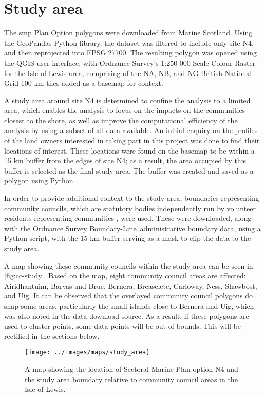 \section{Study area}

The \gls{smp} Plan Option polygons were downloaded from Marine Scotland. Using the GeoPandas Python library, the dataset was filtered to include only site N4, and then reprojected into EPSG:27700. The resulting polygon was opened using the QGIS user interface, with Ordnance Survey's 1:250 000 Scale Colour Raster for the Isle of Lewis area, comprising of the NA, NB, and NG British National Grid 100 km tiles added as a basemap for context.

A study area around site N4 is determined to confine the analysis to a limited area, which enables the analysis to focus on the impacts on the communities closest to the shore, as well as improve the computational efficiency of the analysis by using a subset of all data available. An initial enquiry on the profiles of the land owners interested in taking part in this project was done to find their locations of interest. These locations were found on the basemap to be within a 15 km buffer from the edges of site N4; as a result, the area occupied by this buffer is selected as the final study area. The buffer was created and saved as a polygon using Python.

In order to provide additional context to the study area, boundaries representing community councils, which are statutory bodies independently run by volunteer residents representing communities \autocite{cnes-cc}, were used. These were downloaded, along with the Ordnance Survey Boundary-Line\texttrademark\ administrative boundary data, using a Python script, with the 15 km buffer serving as a mask to clip the data to the study area.

A map showing these community councils within the study area can be seen in \autoref{fig:cc-study}. Based on the map, eight community council areas are affected: Airidhantuim, Barvas and Brue, Bernera, Breasclete, Carloway, Ness, Shawbost, and Uig. It can be observed that the overlayed community council polygons do snap some areas, particularly the small islands close to Bernera and Uig, which was also noted in the data download source. As a result, if these polygons are used to cluster points, some data points will be out of bounds. This will be rectified in the sections below.

\begin{figure}
  \centering
  \texttt{[image: ../images/maps/study\_area]}
  \caption{A map showing the location of Sectoral Marine Plan option N4 and the study area boundary relative to community council areas in the Isle of Lewis. \label{fig:cc-study}}
\end{figure}

